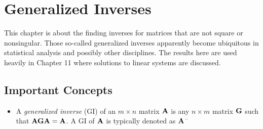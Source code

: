 \documentclass[a4paper, oneside]{book}
\begin{document}
\chapter{Generalized Inverses}

This chapter is about the finding inverses for matrices that are not square or nonsingular. Those so-called generalized inverses apparently become ubiquitous in statistical analysis and possibly other disciplines. The results here are used heavily in Chapter 11 where solutions to linear systems are discussed.


\section*{Important Concepts}
\begin{itemize}
\item A \textit{generalized inverse} (GI) of an $m\times n$ matrix $\mathbf A$ is any $n\times m$ matrix $\mathbf G$ such that $\mathbf{AGA=A}$. A GI of $\mathbf A$ is typically denoted as $\mathbf A^-$
\end{itemize}
\end{document}
